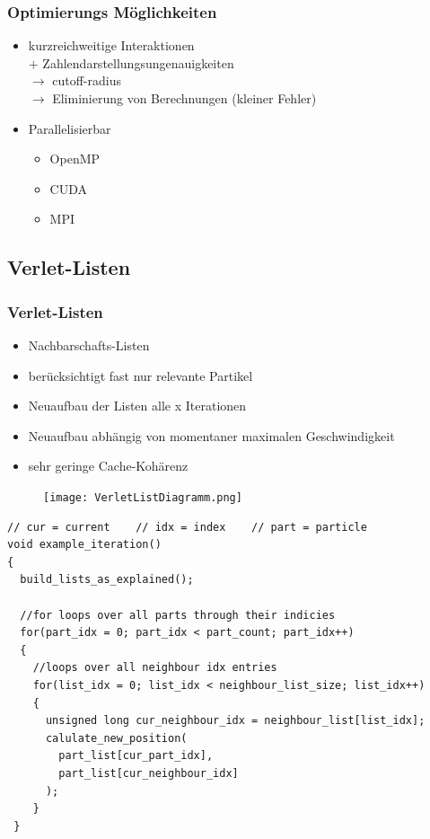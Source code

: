 \documentclass[compress]{beamer}
\begin{document}
\begin{frame}%
	\frametitle{Optimierungs Möglichkeiten}
    \begin{itemize}
	    \item kurzreichweitige Interaktionen\\
        	$+$ Zahlendarstellungsungenauigkeiten\\
        	$\rightarrow$ cutoff-radius\\
        	$\rightarrow$ Eliminierung von Berechnungen (kleiner Fehler)
        \item Parallelisierbar
        \begin{itemize}
	        \item OpenMP
            \item CUDA
            \item MPI
        \end{itemize}
    \end{itemize}
\end{frame}
\subsection{Verlet-Listen}
\begin{frame}%
	\frametitle{Verlet-Listen}
	\begin{itemize}
		\item Nachbarschafts-Listen
        \item berücksichtigt fast nur relevante Partikel
        \item Neuaufbau der Listen alle x Iterationen
		\item Neuaufbau abhängig von momentaner maximalen Geschwindigkeit
        \item sehr geringe Cache-Kohärenz
	\end{itemize}
\end{frame}
\begin{frame}%
	\begin{figure}
		\begin{center}
			\texttt{[image: VerletListDiagramm.png]}
		\end{center}
	\end{figure}
\end{frame}
\begin{frame}[fragile]%
  \begin{verbatim}
// cur = current    // idx = index    // part = particle
void example_iteration()
{
  build_lists_as_explained();

  //for loops over all parts through their indicies
  for(part_idx = 0; part_idx < part_count; part_idx++)
  {
    //loops over all neighbour idx entries
    for(list_idx = 0; list_idx < neighbour_list_size; list_idx++)
    {
      unsigned long cur_neighbour_idx = neighbour_list[list_idx];
      calulate_new_position(
        part_list[cur_part_idx],
        part_list[cur_neighbour_idx]
      );
    }
 }
    \end{verbatim}
\end{frame}
\end{document}
